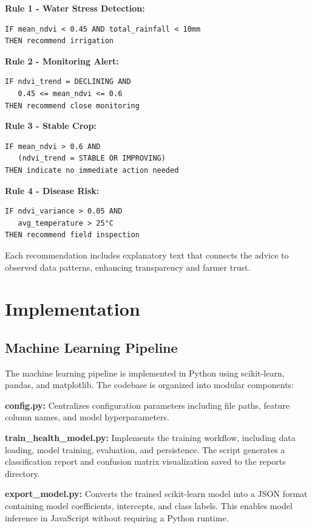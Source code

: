\documentclass[journal]{IEEEtran}
\begin{document}
\textbf{Rule 1 - Water Stress Detection:}
\begin{verbatim}
IF mean_ndvi < 0.45 AND total_rainfall < 10mm
THEN recommend irrigation
\end{verbatim}

\textbf{Rule 2 - Monitoring Alert:}
\begin{verbatim}
IF ndvi_trend = DECLINING AND 
   0.45 <= mean_ndvi <= 0.6
THEN recommend close monitoring
\end{verbatim}

\textbf{Rule 3 - Stable Crop:}
\begin{verbatim}
IF mean_ndvi > 0.6 AND 
   (ndvi_trend = STABLE OR IMPROVING)
THEN indicate no immediate action needed
\end{verbatim}

\textbf{Rule 4 - Disease Risk:}
\begin{verbatim}
IF ndvi_variance > 0.05 AND 
   avg_temperature > 25°C
THEN recommend field inspection
\end{verbatim}

Each recommendation includes explanatory text that connects the advice to observed data patterns, enhancing transparency and farmer trust.

\section{Implementation}

\subsection{Machine Learning Pipeline}

The machine learning pipeline is implemented in Python using scikit-learn, pandas, and matplotlib. The codebase is organized into modular components:

\textbf{config.py:} Centralizes configuration parameters including file paths, feature column names, and model hyperparameters.

\textbf{train\_health\_model.py:} Implements the training workflow, including data loading, model training, evaluation, and persistence. The script generates a classification report and confusion matrix visualization saved to the reports directory.

\textbf{export\_model.py:} Converts the trained scikit-learn model into a JSON format containing model coefficients, intercepts, and class labels. This enables model inference in JavaScript without requiring a Python runtime.
\end{document}

